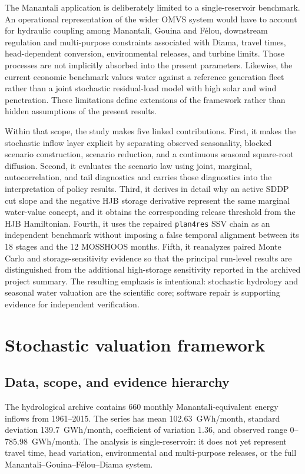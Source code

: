 \documentclass[11pt,a4paper]{article}
\begin{document}
The Manantali application is deliberately limited to a single-reservoir benchmark.
An operational representation of the wider OMVS system would have to account for
hydraulic coupling among Manantali, Gouina and F\'elou, downstream regulation and
multi-purpose constraints associated with Diama, travel times, head-dependent
conversion, environmental releases, and turbine limits. Those processes are not
implicitly absorbed into the present parameters. Likewise, the current economic
benchmark values water against a reference generation fleet rather than a joint
stochastic residual-load model with high solar and wind penetration. These
limitations define extensions of the framework rather than hidden assumptions of
the present results.

Within that scope, the study makes five linked contributions. First, it makes the
stochastic inflow layer explicit by separating observed seasonality, blocked
scenario construction, scenario reduction, and a continuous seasonal square-root
diffusion. Second, it evaluates the scenario law using joint, marginal,
autocorrelation, and tail diagnostics and carries those diagnostics into the
interpretation of policy results. Third, it derives in detail why an active SDDP
cut slope and the negative HJB storage derivative represent the same marginal
water-value concept, and it obtains the corresponding release threshold from the
HJB Hamiltonian. Fourth, it uses the repaired \texttt{plan4res} SSV chain as an
independent benchmark without imposing a false temporal alignment between its 18
stages and the 12 MOSSHOOS months. Fifth, it reanalyzes paired Monte Carlo and
storage-sensitivity evidence so that the principal run-level results are distinguished
from the additional high-storage sensitivity reported in the archived project summary. The resulting emphasis is intentional:
stochastic hydrology and seasonal water valuation are the scientific core;
software repair is supporting evidence for independent verification.

\section{Stochastic valuation framework}\label{sec:methods}

\subsection{Data, scope, and evidence hierarchy}
The hydrological archive contains 660 monthly Manantali-equivalent energy inflows
from 1961--2015. The series has mean 102.63~GWh/month, standard deviation
139.7~GWh/month, coefficient of variation 1.36, and observed range
0--785.98~GWh/month. The analysis is single-reservoir: it does not yet represent
travel time, head variation, environmental and multi-purpose releases, or the
full Manantali--Gouina--F\'elou--Diama system.
\end{document}
